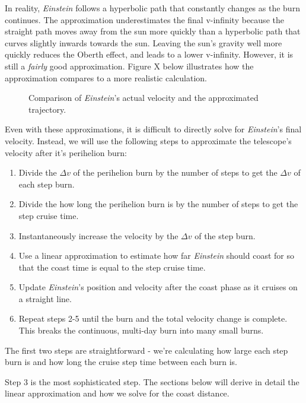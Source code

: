 \documentclass[12pt]{article} %
\begin{document}
In reality, \textit{Einstein} follows a hyperbolic path that constantly changes as the burn continues. The approximation underestimates the final v-infinity because the straight path moves away from the sun more quickly than a hyperbolic path that curves slightly inwards towards the sun. Leaving the sun's gravity well more quickly reduces the Oberth effect, and leads to a lower v-infinity. However, it is still a \textit{fairly} good approximation. Figure X below illustrates how the approximation compares to a more realistic calculation.

\begin{figure}[H]

\caption{Comparison of \textit{Einstein}'s actual velocity and the approximated trajectory.}

\end{figure}


Even with these approximations, it is difficult to directly solve for \textit{Einstein}'s final velocity. Instead, we will use the following steps to approximate the telescope's velocity after it's perihelion burn:

\begin{enumerate}
\item Divide the $\Delta v$ of the perihelion burn by the number of steps to get the $\Delta v$ of each step burn.
\item Divide the how long the perihelion burn is by the number of steps to get the step cruise time. 
\item Instantaneously increase the velocity by the $\Delta v$ of the step burn.
\item Use a linear approximation to estimate how far \textit{Einstein} should coast for so that the coast time is equal to the step cruise time.
\item Update \textit{Einstein}'s position and velocity after the coast phase as it cruises on a straight line.
\item Repeat steps 2-5 until the burn and the total velocity change is complete. This breaks the continuous, multi-day burn into many small burns.
\end{enumerate}

The first two steps are straightforward - we're calculating how large each step burn is and how long the cruise step time between each burn is.

Step 3 is the most sophisticated step. The sections below will derive in detail the linear approximation and how we solve for the coast distance.
\end{document}
